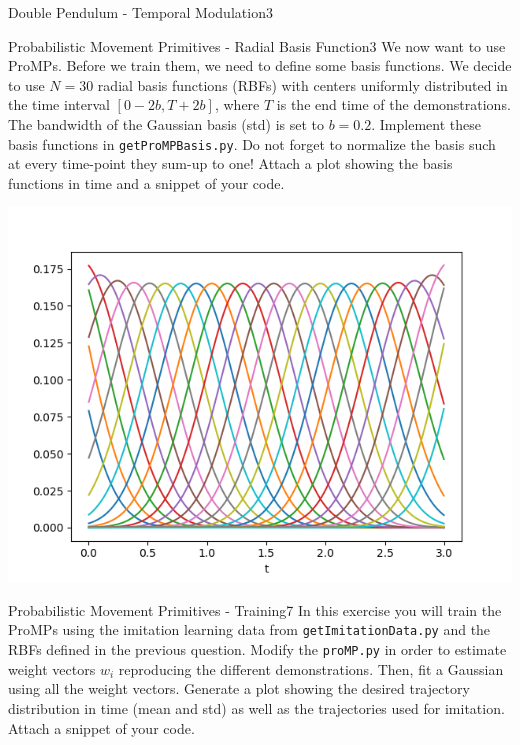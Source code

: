 \begin{questions}
\begin{question}{Double Pendulum - Temporal Modulation}{3}
\end{question}


\begin{question}[bonus]{Probabilistic Movement Primitives - Radial Basis Function}{3}
We now want to use ProMPs. Before we train them, we need to define some basis functions. We decide to use $N = 30$ radial basis functions (RBFs) with centers uniformly distributed in the time interval $[0-2b,T+2b]$, where $T$ is the end time of the demonstrations.
The bandwidth of the Gaussian basis (std) is set to $b=0.2$. 
Implement these basis functions in \texttt{getProMPBasis.py}. 
Do not forget to normalize the basis such at every time-point they sum-up to one! Attach a plot showing the basis functions in time and a snippet of your code. 

\begin{answer}

\begin{center}
	\includegraphics[width=0.6\linewidth]{img/2f.png}
	\label{fig:gaussian_basis}
\end{center}


\end{answer}
\end{question}


\begin{question}[bonus]{Probabilistic Movement Primitives - Training}{7}
In this exercise you will train the ProMPs using the imitation learning data from \texttt{getImitationData.py} and the RBFs defined in the previous question. Modify the \texttt{proMP.py} in order to estimate weight vectors $w_i$ reproducing the different demonstrations. Then, fit a Gaussian using all the weight vectors. Generate a plot showing the desired trajectory distribution in time (mean and std) as well as the trajectories used for imitation. Attach a snippet of your code.


\end{question}
\end{questions}
